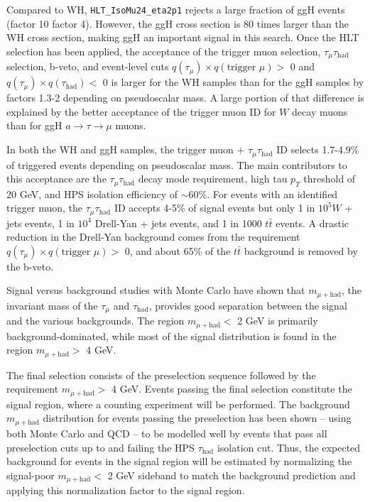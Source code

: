 Compared to WH, \texttt{HLT\_IsoMu24\_eta2p1} rejects a large fraction of ggH events (factor 10 \vs factor 4).  However, the ggH cross section is 80 times larger than the WH cross section, making ggH an important signal in this search.  Once the HLT selection has been applied, the acceptance of the trigger muon selection, $\tau_{\mu}\tau_{\text{had}}$ selection, b-veto, and event-level cuts $q(\tau_{\mu}) \times q(\text{trigger }\mu) >$ 0 and $q(\tau_{\mu}) \times q(\tau_{\text{had}}) <$ 0 is larger for the WH samples than for the ggH samples by factors 1.3-2 depending on pseudoscalar mass.  A large portion of that difference is explained by the better acceptance of the trigger muon ID for $W$ decay muons than for ggH $a\rightarrow\tau\rightarrow\mu$ muons.

In both the WH and ggH samples, the trigger muon + $\tau_{\mu}\tau_{\text{had}}$ ID selects 1.7-4.9\% of triggered events depending on pseudoscalar mass.  The main contributors to this acceptance are the $\tau_{\mu}\tau_{\text{had}}$ decay mode requirement, high tau $p_T$ threshold of 20 GeV, and HPS isolation efficiency of $\sim$60\%.  For events with an identified trigger muon, the $\tau_{\mu}\tau_{\text{had}}$ ID accepts 4-5\% of signal events but only 1 in $10^{5} W$ + jets events, 1 in $10^{4}$ Drell-Yan + jets events, and 1 in 1000 $t\bar{t}$ events.  A drastic reduction in the Drell-Yan background comes from the requirement $q(\tau_{\mu}) \times q(\text{trigger }\mu) >$ 0, and about 65\% of the $t\bar{t}$ background is removed by the b-veto.

Signal versus background studies with Monte Carlo have shown that $m_{\mu+\text{had}}$, the invariant mass of the $\tau_{\mu}$ and $\tau_{\text{had}}$, provides good separation between the signal and the various backgrounds. The region $m_{\mu+\text{had}} <$ 2 GeV is primarily background-dominated, while most of the signal distribution is found in the region $m_{\mu+\text{had}} >$ 4 GeV.

The final selection consists of the preselection sequence followed by the requirement $m_{\mu+\text{had}} >$ 4 GeV. Events passing the final selection constitute the signal region, where a counting experiment will be performed. The background $m_{\mu+\text{had}}$ distribution for events passing the preselection has been shown -- using both Monte Carlo and QCD -- to be modelled well by events that pass all preselection cuts up to and failing the HPS $\tau_{\text{had}}$ isolation cut. Thus, the expected background for events in the signal region will be estimated by normalizing the signal-poor $m_{\mu+\text{had}} <$ 2 GeV sideband to match the background prediction and applying this normalization factor to the signal region.
